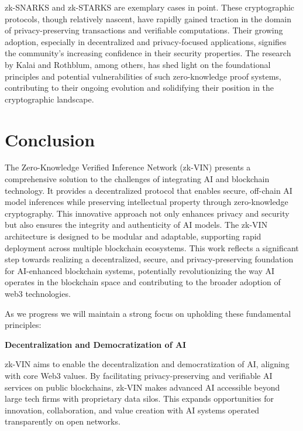 \documentclass[conference]{IEEEtran}
\begin{document}
zk-SNARKS and zk-STARKS are exemplary cases in point. These cryptographic protocols, though relatively nascent, have rapidly gained traction in the domain of privacy-preserving transactions and verifiable computations. Their growing adoption, especially in decentralized and privacy-focused applications, signifies the community's increasing confidence in their security properties. The research by Kalai and Rothblum, among others, has shed light on the foundational principles and potential vulnerabilities of such zero-knowledge proof systems, contributing to their ongoing evolution and solidifying their position in the cryptographic landscape.

\clearpage
\section{Conclusion}
The Zero-Knowledge Verified Inference Network (zk-VIN) presents a comprehensive solution to the challenges of integrating AI and blockchain technology. It provides a decentralized protocol that enables secure, off-chain AI model inferences while preserving intellectual property through zero-knowledge cryptography. This innovative approach not only enhances privacy and security but also ensures the integrity and authenticity of AI models. The zk-VIN architecture is designed to be modular and adaptable, supporting rapid deployment across multiple blockchain ecosystems. This work reflects a significant step towards realizing a decentralized, secure, and privacy-preserving foundation for AI-enhanced blockchain systems, potentially revolutionizing the way AI operates in the blockchain space and contributing to the broader adoption of web3 technologies.

As we progress we will maintain a strong focus on upholding these fundamental principles:

\noindent \textbf{Decentralization and Democratization of AI}

zk-VIN aims to enable the decentralization and democratization of AI, aligning with core Web3 values. By facilitating privacy-preserving and verifiable AI services on public blockchains, zk-VIN makes advanced AI accessible beyond large tech firms with proprietary data silos. This expands opportunities for innovation, collaboration, and value creation with AI systems operated transparently on open networks.
\end{document}
